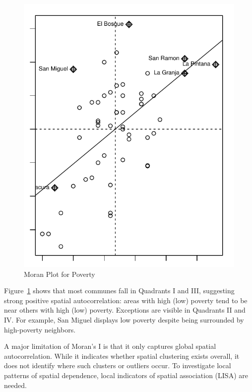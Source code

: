 \documentclass[english,12pt]{book}\usepackage[]{graphicx}\usepackage[]{xcolor}
\makeatletter
\def\maxwidth{ %
  \ifdim\Gin@nat@width>\linewidth
    \linewidth
  \else
    \Gin@nat@width
  \fi
}
\newenvironment{knitrout}{}{} %
\makeatother
\begin{document}
\begin{figure}[ht]
\caption{Moran Plot for Poverty}\label{fig:mp-poverty}
\begin{knitrout}
\color{fgcolor}

{\centering \includegraphics[width=\maxwidth]{figure/moran-plotT-1} 

}


\end{knitrout}
\end{figure}

Figure~\ref{fig:mp-poverty} shows that most communes fall in Quadrants I and III, suggesting strong positive spatial autocorrelation: areas with high (low) poverty tend to be near others with high (low) poverty. Exceptions are visible in Quadrants II and IV. For example, San Miguel displays low poverty despite being surrounded by high-poverty neighbors.

A major limitation of Moran’s I is that it only captures global spatial autocorrelation. While it indicates whether spatial clustering exists overall, it does not identify where such clusters or outliers occur. To investigate local patterns of spatial dependence, local indicators of spatial association (LISA) are needed.
\end{document}

